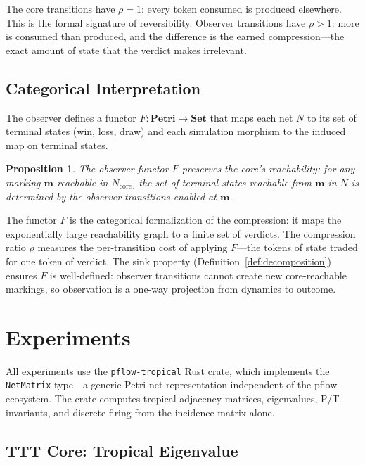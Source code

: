 \documentclass[11pt,a4paper]{article}
\newtheorem{proposition}[theorem]{Proposition}
\newcommand{\Petri}{\mathbf{Petri}}
\begin{document}
The core transitions have $\rho = 1$: every token consumed is produced elsewhere.
This is the formal signature of reversibility.
Observer transitions have $\rho > 1$: more is consumed than produced, and the difference is the earned compression---the exact amount of state that the verdict makes irrelevant.

\subsection{Categorical Interpretation}

The observer defines a functor $F : \Petri \to \mathbf{Set}$ that maps each net $N$ to its set of terminal states (win, loss, draw) and each simulation morphism to the induced map on terminal states.

\begin{proposition}
The observer functor $F$ preserves the core's reachability: for any marking $\mathbf{m}$ reachable in $N_{\mathrm{core}}$, the set of terminal states reachable from $\mathbf{m}$ in $N$ is determined by the observer transitions enabled at $\mathbf{m}$.
\end{proposition}

The functor $F$ is the categorical formalization of the compression: it maps the exponentially large reachability graph to a finite set of verdicts.
The compression ratio $\rho$ measures the per-transition cost of applying $F$---the tokens of state traded for one token of verdict.
The sink property (Definition~\ref{def:decomposition}) ensures $F$ is well-defined: observer transitions cannot create new core-reachable markings, so observation is a one-way projection from dynamics to outcome.

\section{Experiments}
\label{sec:experiments}

All experiments use the \texttt{pflow-tropical} Rust crate, which implements the \texttt{NetMatrix} type---a generic Petri net representation independent of the pflow ecosystem.
The crate computes tropical adjacency matrices, eigenvalues, P/T-invariants, and discrete firing from the incidence matrix alone.

\subsection{TTT Core: Tropical Eigenvalue}
\end{document}
